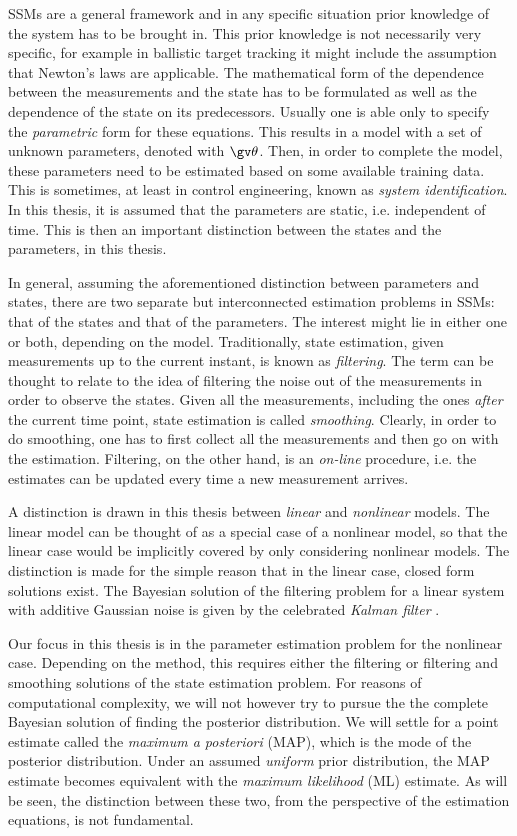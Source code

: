 SSMs are a general framework and in any specific situation prior knowledge of the
system has to be brought in. This prior knowledge is not necessarily very specific,
for example in ballistic target tracking it might include the assumption that Newton's
laws are applicable. The mathematical form of the dependence
between the measurements and the state has to be formulated as well as the dependence
of the state on its predecessors. Usually one is able only to specify the 
\emph{parametric} form for these equations. This results in a model with a set
of unknown parameters, denoted with $\Th$. Then, in order
to complete the model, these parameters need to be estimated based on some available
training data. This is sometimes, at least
in control engineering, known as \emph{system identification}. In this thesis,
it is assumed that the parameters are static, i.e. independent of time. 
This is then an important distinction between the states and
the parameters, in this thesis.

In general, assuming the aforementioned distinction between parameters and states, there are two separate but
interconnected estimation problems in SSMs: that of the states and that of the parameters. The interest might
lie in either one or both, depending on the model. Traditionally, state
estimation, given measurements up to the current instant, is known as \emph{filtering}.
The term can be thought to relate to the idea of filtering the noise out of the measurements
in order to observe the states. Given all the measurements, including the ones
\emph{after} the current time point, state estimation is called \emph{smoothing}.
Clearly, in order to do smoothing, one has to first collect all the measurements
and then go on with the estimation. Filtering, on the other hand, is an \emph{on-line}
procedure, i.e. the estimates can be updated every time a new measurement arrives.

A distinction is drawn in this thesis between \emph{linear} and \emph{nonlinear}
models. The linear model can be thought of as a special case of a nonlinear model,
so that the linear case would be implicitly covered by only considering nonlinear models.
The distinction is made for the simple reason that in the linear case, closed
form solutions exist. The Bayesian solution of the filtering problem for a linear system
with additive Gaussian noise is given by the celebrated \emph{Kalman filter} \parencite{Kalman1960}.

Our focus in this thesis is in the parameter estimation problem for the nonlinear case.
Depending on the method, this requires either the filtering or filtering and smoothing
solutions of the state estimation problem. For reasons of computational complexity, we will not however try to pursue
the the complete Bayesian solution of finding the posterior distribution. We will settle
for a point estimate called the \emph{maximum a posteriori} (MAP), which is the mode
of the posterior distribution. Under an assumed \emph{uniform} prior distribution,
the MAP estimate becomes equivalent with the \emph{maximum likelihood} (ML) estimate.
As will be seen, the distinction between these two, from the perspective of the
estimation equations, is not fundamental.

